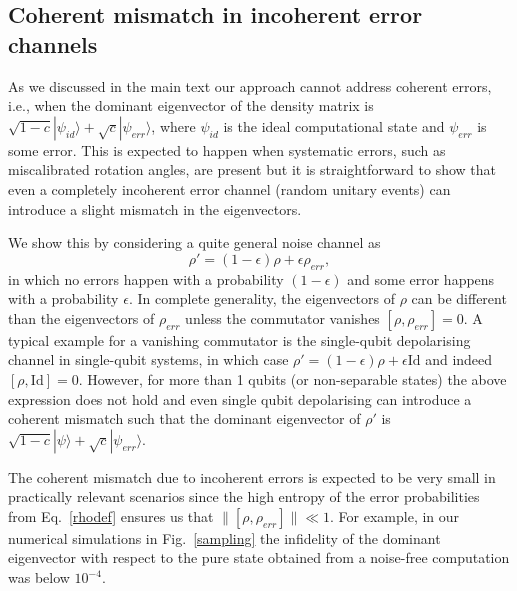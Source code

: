 \documentclass[aps,prx,showpacs,twocolumn,reprint]{revtex4-2}
\begin{document}
{\subsection{Coherent mismatch in incoherent error channels \label{coherrorsec}}

As we discussed in the main text our approach cannot address
coherent errors, i.e., when the dominant eigenvector of 
the density matrix is $ \sqrt{1-c} | \psi_{id} \rangle + \sqrt{c} | \psi_{err} \rangle$,
where $\psi_{id}$ is the ideal computational state and $\psi_{err}$ is some error.
This is expected to happen when systematic errors, such as miscalibrated
rotation angles, are present but it is straightforward to show that
even a completely incoherent error channel (random unitary events) can
introduce a slight mismatch in the eigenvectors. 


We show this by considering a quite general noise channel as
\begin{equation} \label{error_channel}
 \rho' = (1-\epsilon) \rho + \epsilon \rho_{err},
\end{equation}
in which no errors happen with a probability $(1-\epsilon)$
and some error happens with a probability $\epsilon$.
In complete generality, the eigenvectors of $\rho$ can
be different than the eigenvectors of $\rho_{err}$ unless the
commutator vanishes $[\rho, \rho_{err}] =0$. A typical example
for a vanishing commutator is the single-qubit depolarising channel in single-qubit
systems, in which case $\rho' = (1-\epsilon) \rho + \epsilon \mathrm{Id}$
and indeed $[\rho, \mathrm{Id}] =0$.
However, for more than 1 qubits (or non-separable states) the
above expression does not hold and even single qubit depolarising can
introduce  a coherent mismatch such that the dominant eigenvector of $\rho'$
is $ \sqrt{1-c} | \psi \rangle + \sqrt{c} | \psi_{err} \rangle$.



The coherent mismatch due to incoherent errors is expected to be very small
in practically relevant scenarios since the high entropy of the error probabilities
from Eq.~\eqref{rhodef} ensures us that $\lVert [\rho, \rho_{err}] \rVert \ll 1$. 
For example, in our numerical simulations in Fig.~\ref{sampling} the
infidelity of the dominant eigenvector with respect to the pure
state obtained from a noise-free computation was below $10^{-4}$.





}
\end{document}
